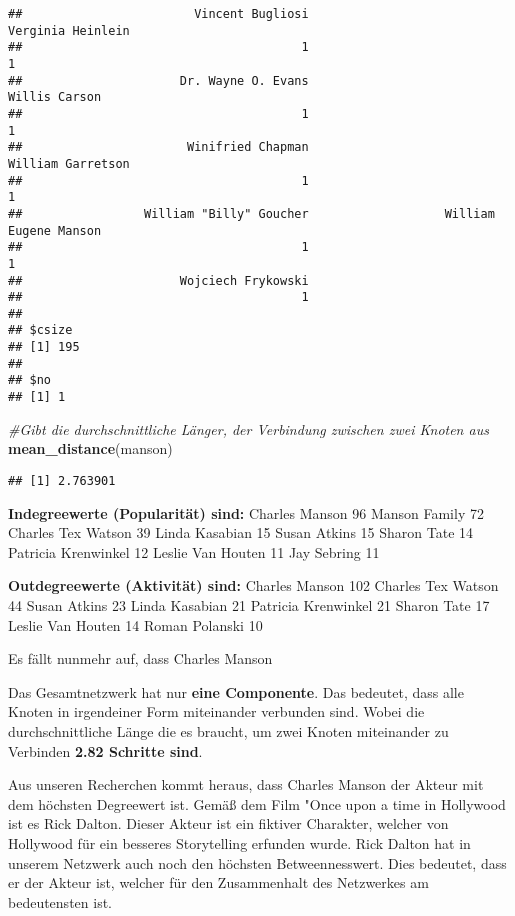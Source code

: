 \documentclass[
]{article}
\newenvironment{Shaded}{\begin{snugshade}}{\end{snugshade}}
\newcommand{\CommentTok}[1]{\textcolor[rgb]{0.56,0.35,0.01}{\textit{#1}}}
\newcommand{\KeywordTok}[1]{\textcolor[rgb]{0.13,0.29,0.53}{\textbf{#1}}}
\newcommand{\NormalTok}[1]{#1}
\begin{document}
\begin{verbatim}
##                        Vincent Bugliosi                       Verginia Heinlein 
##                                       1                                       1 
##                      Dr. Wayne O. Evans                           Willis Carson 
##                                       1                                       1 
##                       Winifried Chapman                       William Garretson 
##                                       1                                       1 
##                 William "Billy" Goucher                   William Eugene Manson 
##                                       1                                       1 
##                      Wojciech Frykowski 
##                                       1 
## 
## $csize
## [1] 195
## 
## $no
## [1] 1
\end{verbatim}

\begin{Shaded}
\begin{Highlighting}[]
\CommentTok{#Gibt die durchschnittliche Länger, der Verbindung zwischen zwei Knoten aus}
\KeywordTok{mean_distance}\NormalTok{(manson)}
\end{Highlighting}
\end{Shaded}

\begin{verbatim}
## [1] 2.763901
\end{verbatim}

\textbf{Indegreewerte (Popularität) sind:} Charles Manson 96 Manson
Family 72 Charles Tex Watson 39 Linda Kasabian 15 Susan Atkins 15 Sharon
Tate 14 Patricia Krenwinkel 12 Leslie Van Houten 11 Jay Sebring 11

\textbf{Outdegreewerte (Aktivität) sind:} Charles Manson 102 Charles Tex
Watson 44 Susan Atkins 23 Linda Kasabian 21 Patricia Krenwinkel 21
Sharon Tate 17 Leslie Van Houten 14 Roman Polanski 10

Es fällt nunmehr auf, dass Charles Manson

Das Gesamtnetzwerk hat nur \textbf{eine Componente}. Das bedeutet, dass
alle Knoten in irgendeiner Form miteinander verbunden sind. Wobei die
durchschnittliche Länge die es braucht, um zwei Knoten miteinander zu
Verbinden \textbf{2.82 Schritte sind}.

Aus unseren Recherchen kommt heraus, dass Charles Manson der Akteur mit
dem höchsten Degreewert ist. Gemäß dem Film "Once upon a time in
Hollywood ist es Rick Dalton. Dieser Akteur ist ein fiktiver Charakter,
welcher von Hollywood für ein besseres Storytelling erfunden wurde. Rick
Dalton hat in unserem Netzwerk auch noch den höchsten Betweennesswert.
Dies bedeutet, dass er der Akteur ist, welcher für den Zusammenhalt des
Netzwerkes am bedeutensten ist.
\end{document}
